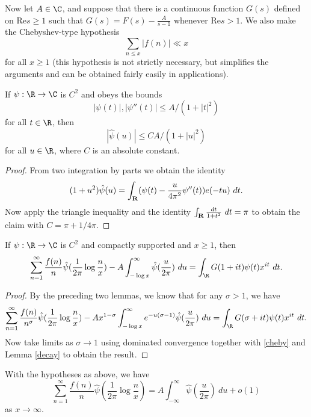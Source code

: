 Now let $A \in \C$, and suppose that there is a continuous function $G(s)$ defined on $\mathrm{Re} s \geq 1$ such that $G(s) = F(s) - \frac{A}{s-1}$ whenever $\mathrm{Re} s > 1$.  We also make the Chebyshev-type hypothesis
\begin{equation}\label{cheby}
\sum_{n \leq x} |f(n)| \ll x
\end{equation}
for all $x \geq 1$ (this hypothesis is not strictly necessary, but simplifies the arguments and can be obtained fairly easily in applications).


\begin{lemma}\label{decay}\leanok  If $\psi:\R \to \C$ is $C^2$ and obeys the bounds
  $$ |\psi(t)|, |\psi''(t)| \leq A / (1 + |t|^2)$$
  for all $t \in \R$, then
$$ |\hat \psi(u)| \leq C A / (1+|u|^2)$$
for all $u \in \R$, where $C$ is an absolute constant.
\end{lemma}


\begin{proof} From two integration by parts we obtain the identity
$$ (1+u^2) \hat \psi(u) = \int_{\bf R} (\psi(t) - \frac{u}{4\pi^2} \psi''(t)) e(-tu)\ dt.$$
Now apply the triangle inequality and the identity $\int_{\bf R} \frac{dt}{1+t^2}\ dt = \pi$ to obtain the claim with $C = \pi + 1 / 4 \pi$.
\end{proof}


\begin{lemma}\label{limiting}\leanok  If $\psi: \R \to \C$ is $C^2$ and compactly supported and $x \geq 1$, then
$$ \sum_{n=1}^\infty \frac{f(n)}{n} \hat \psi( \frac{1}{2\pi} \log \frac{n}{x} ) - A \int_{-\log x}^\infty \hat \psi(\frac{u}{2\pi})\ du =  \int_\R G(1+it) \psi(t) x^{it}\ dt.$$
\end{lemma}


\begin{proof}
 By the preceding two lemmas, we know that for any $\sigma>1$, we have
  $$ \sum_{n=1}^\infty \frac{f(n)}{n^\sigma} \hat \psi( \frac{1}{2\pi} \log \frac{n}{x} ) - A x^{1-\sigma} \int_{-\log x}^\infty e^{-u(\sigma-1)} \hat \psi(\frac{u}{2\pi})\ du =  \int_\R G(\sigma+it) \psi(t) x^{it}\ dt.$$
  Now take limits as $\sigma \to 1$ using dominated convergence together with \eqref{cheby} and Lemma \ref{decay} to obtain the result.
\end{proof}


\begin{corollary}\label{limiting-cor}\leanok  With the hypotheses as above, we have
  $$ \sum_{n=1}^\infty \frac{f(n)}{n} \hat \psi( \frac{1}{2\pi} \log \frac{n}{x} ) = A \int_{-\infty}^\infty \hat \psi(\frac{u}{2\pi})\ du + o(1)$$
  as $x \to \infty$.
\end{corollary}



